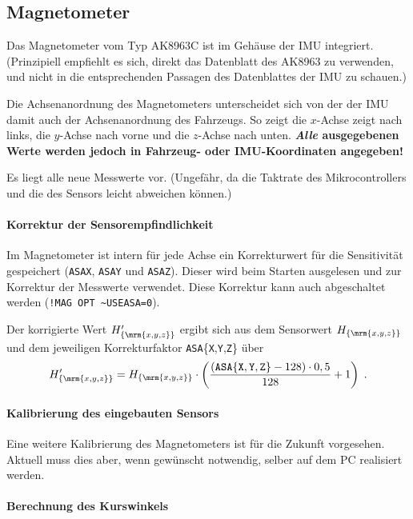 \subsection{Magnetometer}

Das Magnetometer vom Typ AK8963C ist im Gehäuse der IMU integriert. (Prinzipiell empfiehlt es sich, direkt das Datenblatt des AK8963 zu verwenden, und nicht in die entsprechenden Passagen des Datenblattes der IMU zu schauen.)

Die Achsenanordnung des Magnetometers unterscheidet sich von der der IMU \bzw damit auch der Achsenanordnung des Fahrzeugs. So zeigt die $x$-Achse zeigt nach links, die $y$-Achse nach vorne und die $z$-Achse nach unten. \textbf{\emph{Alle} ausgegebenen Werte werden jedoch in Fahrzeug- oder IMU-Koordinaten angegeben!}

Es liegt \ca alle  neue Messwerte vor. (Ungefähr, da die Taktrate des Mikrocontrollers und die des Sensors leicht abweichen können.)


\paragraph{Korrektur der Sensorempfindlichkeit}

Im Magnetometer ist intern für jede Achse ein Korrekturwert für die Sensitivität gespeichert (\texttt{ASAX}, \texttt{ASAY} und \texttt{ASAZ}). Dieser wird beim Starten ausgelesen und zur Korrektur der Messwerte verwendet. Diese Korrektur kann auch abgeschaltet werden (\verb|!MAG OPT ~USEASA=0|).

Der korrigierte Wert $H'_{\{\mrm{x,y,z}\}}$ ergibt sich aus dem Sensorwert $H_{\{\mrm{x,y,z}\}}$ und dem jeweiligen Korrekturfaktor \texttt{ASA}\{\texttt{X},\texttt{Y},\texttt{Z}\} über
\begin{align*}
	H'_{\{\mrm{x,y,z}\}} = H_{\{\mrm{x,y,z}\}} \cdot \left( \frac{(\mathtt{ASA}\{\mathtt{X},\mathtt{Y},\mathtt{Z}\} - 128) \cdot 0,5}{128} + 1 \right)\;.
\end{align*}


\paragraph{Kalibrierung des eingebauten Sensors}

Eine weitere Kalibrierung des Magnetometers ist für die Zukunft vorgesehen. Aktuell muss dies aber, wenn gewünscht \bzw notwendig, selber auf dem PC realisiert werden.


\paragraph{Berechnung des Kurswinkels}

